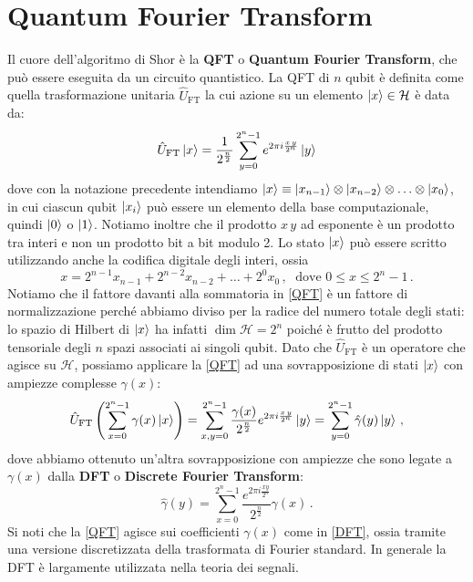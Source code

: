 \section{Quantum Fourier Transform}
Il cuore dell'algoritmo di Shor è la \textbf{QFT} o \textbf{Quantum Fourier Transform}, che può essere eseguita da un circuito quantistico. La QFT di $n$ qubit è definita come quella trasformazione unitaria $\hat U_{\text{FT}}$ la cui azione su un elemento $\ket{x} \in \mathcal{H}$ è data da:
\begin{equation}\label{QFT}
    \hat U_{\text{FT}}\ket x = \frac{1}{2^{\frac n2}}\sum_{y=0}^{2^n-1}e^{2\pi i\frac{ x \, y }{2^n}}\ket y
\end{equation}
dove con la notazione precedente intendiamo $\ket{x} \equiv \ket{x_{n-1}} \otimes \ket{x_{n-2}} \otimes \ldots \otimes \ket{x_0}$, in cui ciascun qubit $\ket{x_i}$ può essere un elemento della base computazionale, quindi $\ket{0}$ o $\ket{1}$. Notiamo inoltre che il prodotto $x\,  y$ ad esponente è un prodotto  tra interi e non un prodotto bit a bit modulo 2. Lo stato $\ket{x}$ può essere scritto utilizzando anche la codifica digitale degli interi, ossia
\begin{equation*}
    x = 2^{n-1} x_{n-1} + 2^{n-2} x_{n-2} + \ldots + 2^{0} x_0 \, , \; \text{ dove } 0 \leq x \leq 2^n - 1 \, .
\end{equation*}
Notiamo che il fattore davanti alla sommatoria in \eqref{QFT} è un fattore di normalizzazione perché abbiamo diviso per la radice del numero totale degli stati: lo spazio di Hilbert di $\ket{x}$ ha infatti $\dim \mathcal{H} = 2^n$ poiché è frutto del prodotto tensoriale degli $n$ spazi associati ai singoli qubit. Dato che $\hat U_{\text{FT}}$ è un operatore che agisce su $\mathcal{H}$, possiamo applicare la \eqref{QFT} ad una sovrapposizione di stati $\ket x$ con ampiezze complesse $\gamma(x)$:
\begin{equation}
    \label{eq:qtf2}
    \hat U_{\text{FT}} \left( \sum_{x=0}^{2^n-1}\gamma(x)\ket x \right) = \sum_{x,y=0}^{2^n-1} \frac{\gamma(x)}{2^{\frac n2}} e^{2\pi i \frac{x\,y}{2^n}} \ket y = \sum_{y=0}^{2^n-1}\hat \gamma(y)\ket y \, ,
\end{equation}
dove abbiamo ottenuto un'altra sovrapposizione con ampiezze che sono legate a $\gamma(x)$ dalla \textbf{DFT} o \textbf{Discrete Fourier Transform}:
\begin{equation}\label{DFT}
    \hat \gamma(y)=\sum_{x=0}^{2^n-1}\frac{e^{2\pi i \frac{x y}{2^n}}}{2^{\frac n2}}\gamma(x) \, .
\end{equation}
Si noti che la \eqref{QFT} agisce sui coefficienti $\gamma(x)$ come in \eqref{DFT}, ossia tramite una versione discretizzata della trasformata di Fourier standard. In generale la DFT è largamente utilizzata nella teoria dei segnali. 

